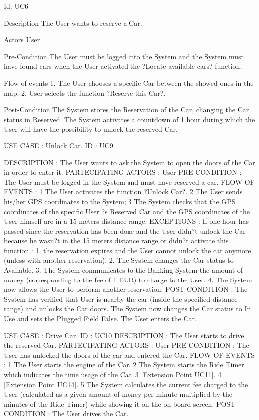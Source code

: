 \documentclass[12pt]{article}
\begin{document}
Id:  UC6


Description
The User wants to reserve a Car.

Actors
User

Pre-Condition
The User must be logged into the System and the System must have found cars when the User activated the ?Locate available cars? function. 


Flow of events
1. The User chooses a specific Car between the showed ones in the map.
2. User selects the function ?Reserve this Car?.

Post-Condition
The System stores the Reservation of the Car, changing the Car status in Reserved.
The System activates a countdown of 1 hour during which the User will have the possibility to unlock the reserved Car.


USE CASE : Unlock Car.
ID : UC9

DESCRIPTION : The User wants to ask the System to open the doors of the Car in order  to enter it.
PARTECIPATING ACTORS : User  
PRE-CONDITION : The User must be logged in the System and must have reserved a car. 
FLOW OF EVENTS : 
1 The User activates the function ?Unlock Car?.
2 The User  sends his/her GPS coordinates to the System; 
3 The System checks that the GPS coordinates of the specific User ?s Reserved Car and the GPS coordinates of the User himself are in a 15 meters distance range. 
EXCEPTIONS :
If one hour has passed since the reservation has been done and the User didn?t unlock the Car because he wasn?t in the 15 meters distance range or didn?t activate this function :
1. the reservation expires and the User cannot unlock the car anymore (unless with another reservation). 
2. The System changes the Car status to Available.
3. The System communicates to the Banking System the amount of money (corresponding to the fee of 1 EUR) to charge to the User.
4. The System now allows the User to perform another reservation. 
POST-CONDITION :  
The System has verified that User is nearby the car (inside the specified distance range) and unlocks the Car doors. 
The System now changes the Car status to In Use and sets the Plugged Field False. 
The User enters the Car.



USE CASE : Drive Car. 
ID : UC10				
DESCRIPTION  : The User starts to drive the reserved Car.
PARTECIPATING ACTORS : User 
PRE-CONDITION : The User has unlocked the doors of the car and entered the Car.
FLOW OF EVENTS : 
1 The User starts the engine of the Car.
2 The System starts the Ride Timer which indicates the time usage of the Car.
3 [Extension Point UC11].
4 [Extension Point UC14].
5 The System calculates the current fee charged to the User (calculated as a given amount of money per minute multiplied by the minutes of the Ride Timer) while showing it on the on-board screen.
POST-CONDITION :  
The User drives the Car. 
\end{document}
